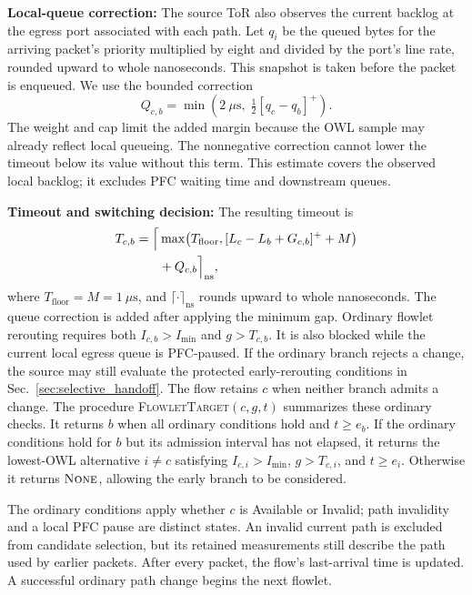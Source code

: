 \documentclass[10pt,journal,compsoc]{IEEEtran}
\begin{document}
\noindent
\textbf{Local-queue correction:} The source ToR also observes the current backlog at the egress port associated with each path. Let $q_i$ be the queued bytes for the arriving packet's priority multiplied by eight and divided by the port's line rate, rounded upward to whole nanoseconds. This snapshot is taken before the packet is enqueued. We use the bounded correction
\begin{equation}
    Q_{c,b}=\min\!\left(2~\mu\mathrm{s},\;\tfrac{1}{2}[q_c-q_b]^+\right).
    \label{eq:queue_correction}
\end{equation}
The weight and cap limit the added margin because the OWL sample may already reflect local queueing. The nonnegative correction cannot lower the timeout below its value without this term. This estimate covers the observed local backlog; it excludes PFC waiting time and downstream queues.

\noindent
\textbf{Timeout and switching decision:} The resulting timeout is
\begin{equation}
    \begin{aligned}
        T_{c,b}=\Bigl\lceil
        &\max\!\left(T_{\mathrm{floor}},[L_c-L_b+G_{c,b}]^++M\right) \\
        &{}+Q_{c,b}\Bigr\rceil_{\mathrm{ns}},
    \end{aligned}
    \label{eq:pair_timeout}
\end{equation}
where $T_{\mathrm{floor}}=M=1~\mu\mathrm{s}$, and $\lceil\cdot\rceil_{\mathrm{ns}}$ rounds upward to whole nanoseconds. The queue correction is added after applying the minimum gap. Ordinary flowlet rerouting requires both $I_{c,b}>I_{\min}$ and $g>T_{c,b}$. It is also blocked while the current local egress queue is PFC-paused. If the ordinary branch rejects a change, the source may still evaluate the protected early-rerouting conditions in Sec.~\ref{sec:selective_handoff}. The flow retains $c$ when neither branch admits a change. The procedure \textsc{FlowletTarget}$(c,g,t)$ summarizes these ordinary checks. It returns $b$ when all ordinary conditions hold and $t\geq e_b$. If the ordinary conditions hold for $b$ but its admission interval has not elapsed, it returns the lowest-OWL alternative $i\neq c$ satisfying $I_{c,i}>I_{\min}$, $g>T_{c,i}$, and $t\geq e_i$. Otherwise it returns $\textsc{None}$, allowing the early branch to be considered.

The ordinary conditions apply whether $c$ is Available or Invalid; path invalidity and a local PFC pause are distinct states. An invalid current path is excluded from candidate selection, but its retained measurements still describe the path used by earlier packets. After every packet, the flow's last-arrival time is updated. A successful ordinary path change begins the next flowlet.
\end{document}
